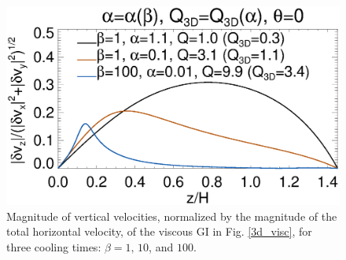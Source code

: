 \begin{figure}
  \includegraphics[width=\linewidth,clip=true,trim=0cm 0.cm 0.23cm
    0.0cm]{figures/eigenvec_vz}
  \caption{Magnitude of vertical velocities, normalized by the
    magnitude of the total horizontal velocity, of the viscous GI in 
    Fig. \ref{3d_visc}, for three cooling times: $\beta=1,\,10$, and $100$. \label{3d_visc_vz}} 
\end{figure}
